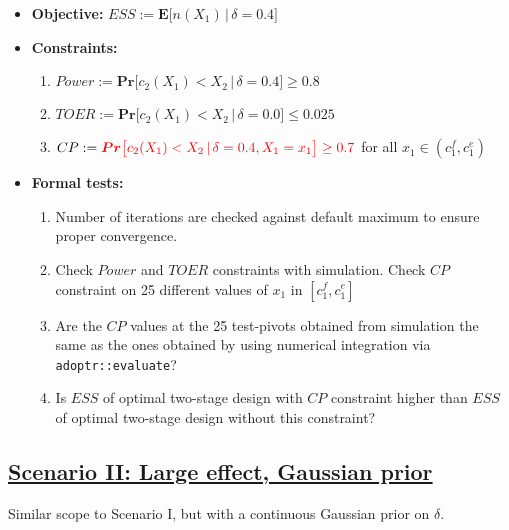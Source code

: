 \documentclass[
]{book}
\providecommand{\tightlist}{%
  \setlength{\itemsep}{0pt}\setlength{\parskip}{0pt}}
\begin{document}
\begin{itemize}
\tightlist
\item
  \textbf{Objective:} \(ESS := \boldsymbol{E}\big[n(X_1)\,|\,\delta=0.4\big]\)
\item
  \textbf{Constraints:}

  \begin{enumerate}
  \def\labelenumi{\arabic{enumi}.}
  \tightlist
  \item
    \(Power := \boldsymbol{Pr}\big[c_2(X_1) < X_2\,|\,\delta=0.4\big] \geq 0.8\)
  \item
    \(TOER := \boldsymbol{Pr}\big[c_2(X_1) < X_2\,|\,\delta=0.0\big] \leq 0.025\)
  \item
    \(CP := \color{red}{\boldsymbol{Pr}\big[c_2(X_1) < X_2\,|\,\delta=0.4, X_1 = x_1\big] \geq 0.7}\) for all \(x_1\in(c_1^f, c_1^e)\)
  \end{enumerate}
\item
  \textbf{Formal tests:}

  \begin{enumerate}
  \def\labelenumi{\arabic{enumi}.}
  \tightlist
  \item
    Number of iterations are checked against default maximum to ensure proper
    convergence.
  \item
    Check \(Power\) and \(TOER\) constraints with simulation.
    Check \(CP\) constraint on 25 different values of \(x_1\) in
    \([c_1^f, c_1^e]\)
  \item
    Are the \(CP\) values at the 25 test-pivots obtained from simulation the
    same as the ones obtained by using numerical integration via
    \texttt{adoptr::evaluate}?
  \item
    Is \(ESS\) of optimal two-stage design with \(CP\) constraint higher than
    \(ESS\) of optimal two-stage design without this constraint?
  \end{enumerate}
\end{itemize}

\hypertarget{scenario-ii-large-effect-gaussian-prior}{%
\subsection{\texorpdfstring{\protect\hyperlink{scenarioII}{Scenario II: Large effect, Gaussian prior}}{Scenario II: Large effect, Gaussian prior}}\label{scenario-ii-large-effect-gaussian-prior}}

Similar scope to Scenario I, but with a continuous Gaussian prior on \(\delta\).
\end{document}
